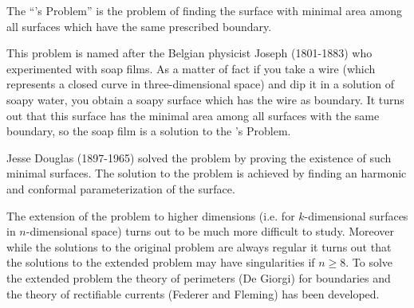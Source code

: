 \documentclass[12pt]{article}
\begin{document}
The ``'s Problem'' is the problem of finding the surface with minimal area among all surfaces which have the same prescribed boundary.

This problem is named after the Belgian physicist Joseph  (1801-1883) who experimented with soap films. As a matter of fact if you take a wire (which represents a closed curve in three-dimensional space) and dip it in a solution of soapy water, you obtain a soapy surface which has the wire as boundary.
It turns out that this surface has the minimal area among all surfaces with the same boundary, so the soap film is a solution to the 's Problem.

Jesse Douglas (1897-1965) solved the problem by proving the existence of such minimal surfaces. The solution to the problem is achieved by finding an harmonic and conformal parameterization of the surface.

The extension of the problem to higher dimensions (i.e. for $k$-dimensional surfaces in $n$-dimensional space) turns out to be much more difficult to study.
Moreover while the solutions to the original problem are always regular it turns out that the solutions to the extended problem may have singularities if 
$n\ge 8$.
To solve the extended problem the theory of perimeters (De Giorgi) for
boundaries and the theory of rectifiable
currents (Federer and Fleming) has been developed.
\end{document}
